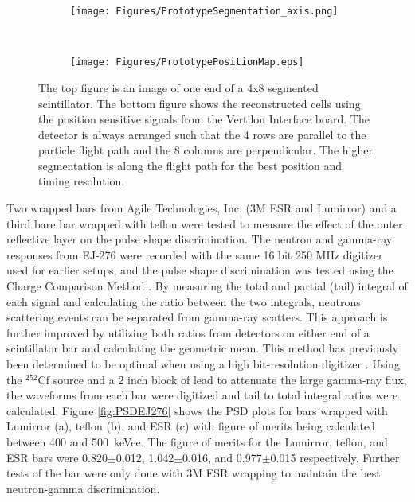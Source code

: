 \begin{figure}[t]
  \centering
 \begin{subfigure}{0.5\textwidth}
  \centering
  \texttt{[image: Figures/PrototypeSegmentation\_axis.png]}
 \end{subfigure}%
  \\
\begin{subfigure}{0.5\textwidth}
  \centering
  \texttt{[image: Figures/PrototypePositionMap.eps]}
\end{subfigure}%
\caption{The top figure is an image of one end of a 4x8 segmented scintillator. The bottom figure shows the reconstructed cells using the position sensitive signals from the Vertilon Interface board. The detector is always arranged such that the 4 rows are parallel to the particle flight path and the 8 columns are perpendicular. The higher segmentation is along the flight path for the best position and timing resolution.}
  \label{fig:PSPMTImage}
\end{figure}
 Two wrapped bars from Agile Technologies, Inc. (3M\textsuperscript{\texttrademark} ESR and Lumirror\textsuperscript{\texttrademark}) and a third bare bar wrapped with teflon were tested to measure the effect of the outer reflective layer on the pulse shape discrimination. The neutron and gamma-ray responses from EJ-276 were recorded with the same 16 bit 250 MHz digitizer used for earlier setups, and the pulse shape discrimination was tested using the Charge Comparison Method \cite{CCMPSD}. By measuring the total and partial (tail) integral of each signal and calculating the ratio between the two integrals, neutrons scattering events can be separated from gamma-ray scatters. This approach is further improved by utilizing both ratios from detectors on either end of a scintillator bar and calculating the geometric mean. This method has previously been determined to be optimal when using a high bit-resolution digitizer \cite{HighResPSD}.
Using the $^{252}$Cf source and a 2 inch block of lead to attenuate the large gamma-ray flux, the waveforms from each bar were digitized and tail to total integral ratios were calculated. Figure \ref{fig:PSDEJ276} shows the PSD plots for bars wrapped with Lumirror\textsuperscript{\texttrademark} (a), teflon (b), and ESR (c) with figure of merits being calculated between 400 and 500~keVee. The figure of merits for the Lumirror\textsuperscript{\texttrademark}, teflon, and ESR bars were 0.820$\pm$0.012, 1.042$\pm$0.016, and 0.977$\pm$0.015 respectively. Further tests of the bar were only done with 3M\textsuperscript{\texttrademark} ESR wrapping to maintain the best neutron-gamma discrimination.

